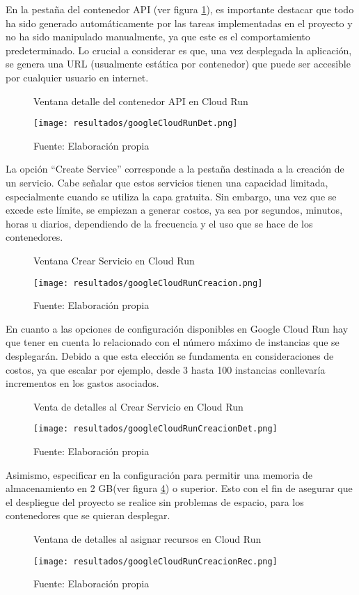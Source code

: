 En la pestaña del contenedor API (ver figura \ref{fig:figuraGoogleCloudRunDet}), es importante destacar que todo ha sido generado automáticamente por las tareas implementadas en el proyecto y no ha sido manipulado manualmente, ya que este es el comportamiento predeterminado. Lo crucial a considerar es que, una vez desplegada la aplicación, se genera una URL (usualmente estática por contenedor) que puede ser accesible por cualquier usuario en internet.

\newpage

\begin{figure}[h]
	\centering
	\caption{Ventana detalle del contenedor API en Cloud Run}
	\texttt{[image: resultados/googleCloudRunDet.png]}
	\caption*{\footnotesize Fuente: Elaboración propia}
	\label{fig:figuraGoogleCloudRunDet}
\end{figure}

La opción ``Create Service'' corresponde a la pestaña destinada a la creación de un servicio. Cabe señalar que estos servicios tienen una capacidad limitada, especialmente cuando se utiliza la capa gratuita. Sin embargo, una vez que se excede este límite, se empiezan a generar costos, ya sea por segundos, minutos, horas u diarios, dependiendo de la frecuencia y el uso que se hace de los contenedores.

\newpage

\begin{figure}[h]
	\centering
	\caption{Ventana Crear Servicio en Cloud Run}
	\texttt{[image: resultados/googleCloudRunCreacion.png]}
	\caption*{\footnotesize Fuente: Elaboración propia}
	\label{fig:figuraGoogleCloudRunCreacion}
\end{figure}

En cuanto a las opciones de configuración disponibles en Google Cloud Run hay que tener en cuenta lo relacionado con el número máximo de instancias que se desplegarán. Debido a que esta elección se fundamenta en consideraciones de costos, ya que escalar por ejemplo, desde 3 hasta 100 instancias conllevaría incrementos en los gastos asociados.

\newpage

\begin{figure}[h]
	\centering
	\caption{Venta de detalles al Crear Servicio en Cloud Run}
	\texttt{[image: resultados/googleCloudRunCreacionDet.png]}
	\caption*{\footnotesize Fuente: Elaboración propia}
	\label{fig:figuraGoogleCloudRunCreacionDet}
\end{figure}


Asimismo, especificar en la configuración para permitir una memoria de almacenamiento en 2 GB(ver figura \ref{fig:figuraGoogleCloudRunCreacionRec}) o superior. Esto con el fin de asegurar que el despliegue del proyecto se realice sin problemas de espacio, para los contenedores que se quieran desplegar.

\begin{figure}[h]
	\centering
	\caption{Ventana de detalles al asignar recursos en Cloud Run}
	\texttt{[image: resultados/googleCloudRunCreacionRec.png]}
	\caption*{\footnotesize Fuente: Elaboración propia}
	\label{fig:figuraGoogleCloudRunCreacionRec}
\end{figure}